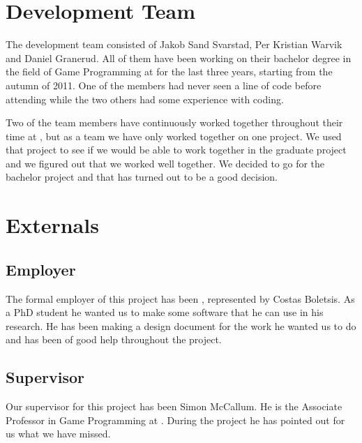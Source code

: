 \section{Development Team}
The development team consisted of Jakob Sand Svarstad, Per Kristian Warvik and Daniel Granerud.
All of them have been working on their bachelor degree in the field of Game Programming at \GUC{} for the last three years, starting from the autumn of 2011. One of the members had never seen a line of code before attending \GUC{} while the two others had some experience with coding.

Two of the team members have continuously worked together throughout their time at \GUC{}, but as a team we have only worked together on one project. We used that project to see if we would be able to work together in the graduate project and we figured out that we worked well together. We decided to go for the bachelor project and that has turned out to be a good decision.

\section{Externals}

\subsection{Employer}
The formal employer of this project has been \GUC{}, represented by Costas Boletsis. As a PhD student he wanted us to make some software that he can use in his research. He has been making a design document for the work he wanted us to do and has been of good help throughout the project.

\subsection{Supervisor}
Our supervisor for this project has been Simon McCallum. He is the Associate Professor in Game Programming at \GUC{}. During the project he has pointed out for us what we have missed.
